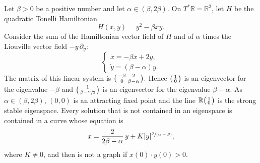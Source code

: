 \documentclass[10pt]{amsart}
\newcommand{\spfrac}[2]{\sfrac{#1}{(#2)}}
\newenvironment{smallpmatrix}{\big(\begin{smallmatrix}}{\end{smallmatrix}\big)}
\theoremstyle{definition}
\def\R{\mathbb{R}}
\begin{document}
Let $\beta>0$ be a positive number and let $\alpha\in(\beta, 2\beta)$. On $T^*\R=\R^2$, let $H$ be the quadratic Tonelli Hamiltonian
\[
H(x, y)=y^2-\beta xy.
\]
Consider the sum of the Hamiltonian vector field of $H$ and of $\alpha$ times the Liouville vector field $-y\, \partial_y$:
\begin{equation}\label{EPat1}
\begin{cases}
\dot x=-\beta x+2y,\\
\dot y=(\beta-\alpha) y.
\end{cases}
\end{equation}
The matrix of this linear system is $\begin{smallpmatrix} -\beta & 2 \\
0&\beta-\alpha
\end{smallpmatrix}.$ Hence $\begin{smallpmatrix} 1\\0
\end{smallpmatrix}$ is an eigenvector for the eigenvalue $-\beta$ and $\begin{smallpmatrix} 1\\ \beta-\sfrac{\alpha}{2}\end{smallpmatrix}$ is an eigenvector for the eigenvalue $\beta-\alpha$. As $\alpha\in(\beta, 2\beta)$, $(0,0)$ is an attracting fixed point and the line $\R\begin{smallpmatrix} 1\\ 0\end{smallpmatrix}$ is the strong stable eigenspace. Every solution that is not contained in an eigenspace is contained in a curve whose equation is
\[
x=\frac{2}{2\beta-\alpha}\,y+K\vert y\vert^{\spfrac{\beta}{\alpha-\beta}},
\]
where $K\not=0$, and then is not a graph if $x(0)\cdot y(0)>0$.

\begin{figure}[htb]
\end{figure}
\end{document}
